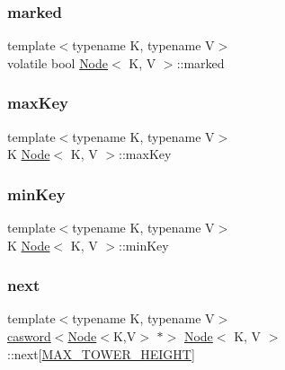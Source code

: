 \subsubsection{\texorpdfstring{marked}{marked}}
{\footnotesize\ttfamily template$<$typename K, typename V$>$ \\
volatile bool \hyperlink{classNode}{Node}$<$ K, V $>$\+::marked}

\mbox{\label{classNode_a952ab64410cb2844499a2cf856848f14}} 
\subsubsection{\texorpdfstring{max\+Key}{maxKey}}
{\footnotesize\ttfamily template$<$typename K, typename V$>$ \\
K \hyperlink{classNode}{Node}$<$ K, V $>$\+::max\+Key}

\mbox{\label{classNode_af389a346229e7fc7a55c07ce18816c72}} 
\subsubsection{\texorpdfstring{min\+Key}{minKey}}
{\footnotesize\ttfamily template$<$typename K, typename V$>$ \\
K \hyperlink{classNode}{Node}$<$ K, V $>$\+::min\+Key}

\mbox{\label{classNode_a1f772846cd18db8938fbae6de5970941}} 
\subsubsection{\texorpdfstring{next}{next}}
{\footnotesize\ttfamily template$<$typename K, typename V$>$ \\
\hyperlink{structcasword}{casword}$<$\hyperlink{classNode}{Node}$<$K,V$>$ $\ast$$>$ \hyperlink{classNode}{Node}$<$ K, V $>$\+::next\mbox{[}\hyperlink{skiplist_8h_a6e5496d00878dd64264b713699766bdb}{M\+A\+X\+\_\+\+T\+O\+W\+E\+R\+\_\+\+H\+E\+I\+G\+HT}\mbox{]}}

\mbox{\label{classNode_a8a7ef9d231138ce3458e3b360c0cee57}} 
